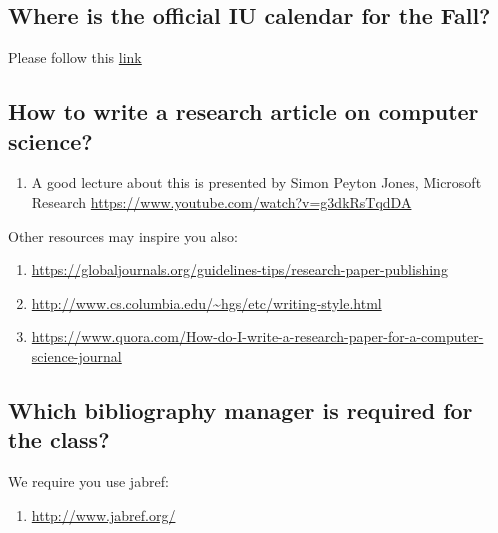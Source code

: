 \subsection{Where is the official IU calendar for the Fall?}
\label{\detokenize{faq:where-is-the-official-iu-calendar-for-the-fall}}
Please follow this
\href{http://registrar.indiana.edu/official-calendar/official-calendar-fall.shtml}{link}


\subsection{How to write a research article on computer science?}
\label{\detokenize{faq:how-to-write-a-research-article-on-computer-science}}\begin{enumerate}
\item {} 
A good lecture about this is presented by Simon Peyton Jones,
Microsoft Research \url{https://www.youtube.com/watch?v=g3dkRsTqdDA}

\end{enumerate}

Other resources may inspire you also:
\begin{enumerate}
\item {} 
\url{https://globaljournals.org/guidelines-tips/research-paper-publishing}

\item {} 
\url{http://www.cs.columbia.edu/~hgs/etc/writing-style.html}

\item {} 
\url{https://www.quora.com/How-do-I-write-a-research-paper-for-a-computer-science-journal}

\end{enumerate}


\subsection{Which bibliography manager is required for the class?}
\label{\detokenize{faq:which-bibliography-manager-is-required-for-the-class}}
We require you use jabref:
\begin{enumerate}
\item {} 
\url{http://www.jabref.org/}

\end{enumerate}


